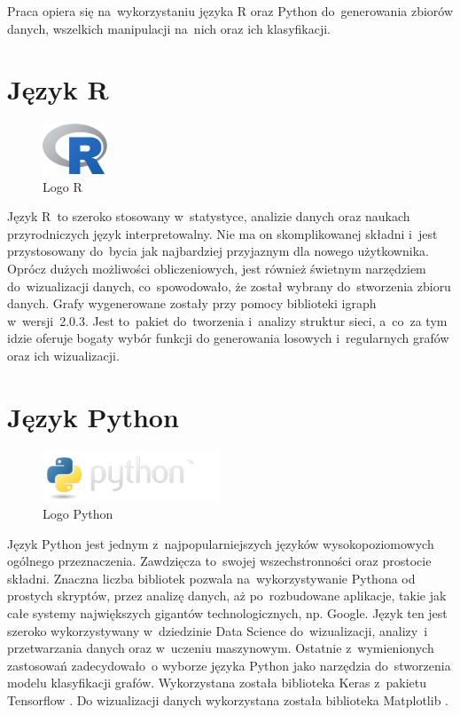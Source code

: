 Praca opiera się na~wykorzystaniu języka R \cite{strR} oraz Python \cite{strPython} do~generowania zbiorów danych,
wszelkich manipulacji na~nich oraz ich klasyfikacji.

\section{Język R}

\begin{figure}[ht]
	\centering
	\includegraphics[height=1.5cm]{resources/technologies/images/logo_r.png}
	\caption{Logo R \cite{strR}}
	\label{Fig:tech-r}
\end{figure}
\FloatBarrier

Język R~to szeroko stosowany w~statystyce, analizie danych oraz naukach przyrodniczych język interpretowalny.
Nie ma on skomplikowanej składni i~jest przystosowany do~bycia jak najbardziej przyjaznym dla nowego użytkownika.
Oprócz dużych możliwości obliczeniowych, jest również świetnym narzędziem do~wizualizacji danych,
co~spowodowało, że został wybrany do~stworzenia zbioru danych.
Grafy wygenerowane zostały przy pomocy biblioteki igraph \cite{strIgraph} w~wersji~2.0.3.
Jest to~pakiet do~tworzenia i~analizy struktur sieci, a~co~za tym idzie oferuje bogaty wybór funkcji do
generowania losowych i~regularnych grafów oraz ich wizualizacji.

\clearpage

\section{Język Python}

\begin{figure}[ht]
	\centering
	\includegraphics[height=1.5cm]{resources/technologies/images/logo_python.png}
	\caption{Logo Python \cite{strPython}}
	\label{Fig:tech-python}
\end{figure}
\FloatBarrier

Język Python jest jednym z~najpopularniejszych języków wysokopoziomowych ogólnego przeznaczenia.
Zawdzięcza to~swojej wszechstronności oraz prostocie składni.
Znaczna liczba bibliotek pozwala na~wykorzystywanie Pythona od prostych skryptów,
przez analizę danych, aż po~rozbudowane aplikacje, takie jak całe
systemy największych gigantów technologicznych, np. Google. Język ten jest szeroko
wykorzystywany w~dziedzinie Data Science do~wizualizacji, analizy~i przetwarzania danych oraz w~uczeniu maszynowym.
Ostatnie z~wymienionych zastosowań zadecydowało~o wyborze języka Python jako narzędzia do~stworzenia modelu klasyfikacji grafów.
Wykorzystana została biblioteka Keras z~pakietu Tensorflow \cite{strTensorFlow}.
Do wizualizacji danych wykorzystana została biblioteka Matplotlib \cite{strMatplotlib}.


